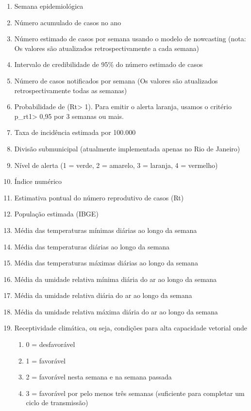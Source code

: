 \begin{enumerate}
    \item Semana epidemiológica
    \item Número acumulado de casos no ano 
    \item Número estimado de casos por semana usando o modelo de nowcasting (nota: Os valores são atualizados retrospectivamente a cada semana)
    \item Intervalo de credibilidade de 95\% do número estimado de casos
    \item Número de casos notificados por semana (Os valores são atualizados retrospectivamente todas as semanas)
    \item Probabilidade de (Rt> 1). Para emitir o alerta laranja, usamos o critério p\_rt1> 0,95 por 3 semanas ou mais.
    \item Taxa de incidência estimada por 100.000
    \item Divisão submunicipal (atualmente implementada apenas no Rio de Janeiro)
    \item Nível de alerta (1 = verde, 2 = amarelo, 3 = laranja, 4 = vermelho)
    \item Índice numérico
    \item Estimativa pontual do número reprodutivo de casos (Rt)
    \item População estimada (IBGE)
    \item Média das temperaturas mínimas diárias ao longo da semana
    \item Média das temperaturas diárias ao longo da semana
    \item Média das temperaturas máximas diárias ao longo da semana
    \item Média da umidade relativa mínima diária do ar ao longo da semana
    \item Média da umidade relativa diária do ar ao longo da semana
    \item Média da umidade relativa máxima diária do ar ao longo da semana
    \item Receptividade climática, ou seja, condições para alta capacidade vetorial onde 
    \begin{enumerate}
        \item 0 = desfavorável
        \item 1 = favorável
        \item  2 = favorável nesta semana e na semana passada 
        \item 3 = favorável por pelo menos três semanas (suficiente para completar um ciclo de transmissão)

\end{enumerate}
\end{enumerate}
